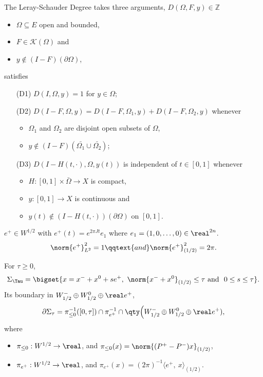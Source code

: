 \documentclass[../main-v2-manifolds.tex]{subfiles}
\begin{document}
\begin{definition}
The Leray-Schauder Degree takes three arguments, $D(\Omega,F,y)\in\mathbb{Z}$
\begin{itemize}
    \item $\Omega \subseteq E$ open and bounded, 
    \item $F \in \mathcal{K}(\Omega)$ and 
    \item $y \notin (I - F)(\partial \Omega)$,
\end{itemize}
satisfies
\begin{itemize}
    \item[(D1)] $D(I, \Omega, y) = 1$ for $y \in \Omega$;
    \item[(D2)] $D(I - F, \Omega, y) = D(I - F, \Omega_1, y) + D(I - F, \Omega_2, y)$ whenever 
    \begin{itemize}
        \item $\Omega_1$ and $\Omega_2$ are disjoint open subsets of $\Omega$,
        \item $y \notin (I - F)(\bar{\Omega_1} \cup \bar{\Omega_2})$;
    \end{itemize}
    \item[(D3)] $D(I - H(t, \cdot), \Omega, y(t))$ is independent of $t \in [0, 1]$ whenever 
    \begin{itemize}
        \item $H: [0, 1] \times \bar{\Omega} \rightarrow X$ is compact, 
        \item $y: [0, 1] \rightarrow X$ is continuous and 
        \item $y(t) \notin (I - H(t, \cdot))(\partial \Omega)$ on $[0, 1]$.
    \end{itemize}
\end{itemize}
\end{definition}
\begin{definition}
    $e^+\in W^{1/2}$ with $e^+(t) = e^{2\pi Jt}e_1$ where $e_1 = (1,0,\ldots,0)\in\realtn$.
    \[
        \norm{e^+}^2_{L^2} = 1\qqtext{and} \norm{e^+}^2_{(1/2)} = 2\pi.
    \]
\end{definition}
\begin{definition}
    For $\tau\geq 0$,
    \[
        \Sigma_\Tau = \bigset{x = x^- + x^0 + se^+,\ \norm{x^- + x^0}_{(1/2)}\leq \tau\ \text{and }\ 0\leq s\leq \tau}.
    \]
    Its boundary in $W_{1/2}^{-}\oplus W_{1/2}^{0}\oplus \real e^+$,
    \[
        \partial\Sigma_{\tau} = \pi^{-1}_{\leq 0}([0,\tau])\cap\pi^{-1}_{e^+}\cap\qty\Big(W_{1/2}^{-}\oplus W_{1/2}^{0}\oplus \real e^+),
    \]
    where
    \begin{itemize}
        \item $\pi_{\leq 0}:W^{1/2}\to\real$, and $\pi_{\leq 0}(x) = \norm{(P^+ - P^-)x}_{(1/2)}$,
        \item $\pi_{e^+}:W^{1/2}\to\real$, and $\pi_{e^+}(x) = (2\pi)^{-1}\langle e^+,\ x\rangle_{(1/2)}$.
    \end{itemize}
\end{definition}
\end{document}
